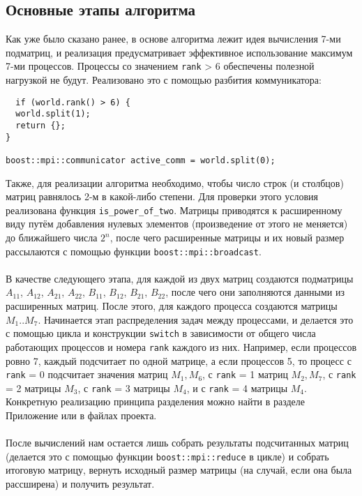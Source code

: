 \documentclass[a4paper,12pt]{article}
\begin{document}
\subsection{Основные этапы алгоритма}
Как уже было сказано ранее, в основе алгоритма лежит идея вычисления 7-ми подматриц, и реализация предусматривает эффективное использование максимум 7-ми процессов. Процессы со значением \texttt{rank} > 6 обеспечены полезной нагрузкой не будут. Реализовано это с помощью разбития коммуникатора:
\begin{lstlisting}
  if (world.rank() > 6) {
  world.split(1);
  return {};
}

boost::mpi::communicator active_comm = world.split(0);
\end{lstlisting}
Также, для реализации алгоритма необходимо, чтобы число строк (и столбцов) матриц равнялось 2-м в какой-либо степени. Для проверки этого условия реализована функция \texttt{is\_power\_of\_two}. Матрицы приводятся к расширенному виду путём добавления нулевых элементов (произведение от этого не меняется) до ближайшего числа $2^n$, после чего расширенные матрицы и их новый размер рассылаются с помощью функции \texttt{boost::mpi::broadcast}.\\ \\
В качестве следующего этапа, для каждой из двух матриц создаются подматрицы $A_{11}$, $A_{12}$, $A_{21}$, $A_{22}$, $B_{11}$, $B_{12}$, $B_{21}$, $B_{22}$, после чего они заполняются данными из расширенных матриц. После этого, для каждого процесса создаются матрицы $M_{1}..M_{7}$. Начинается этап распределения задач между процессами, и делается это с помощью цикла и конструкции \texttt{switch} в зависимости от общего числа работающих процессов и номера \texttt{rank} каждого из них. Например, если процессов ровно 7, каждый подсчитает по одной матрице, а если процессов 5, то процесс с \texttt{rank} = 0 подсчитает значения матриц $M_{1}, M_{6}$, с \texttt{rank} = 1 матриц $M_{2}, M_{7}$, с \texttt{rank} = 2 матрицы $M_{3}$, с \texttt{rank} = 3 матрицы $M_{4}$, и с \texttt{rank} = 4 матрицы $M_{4}$. Конкретную реализацию принципа разделения можно найти в разделе Приложение или в файлах проекта.\\ \\    
После вычислений нам остается лишь собрать результаты подсчитанных матриц (делается это с помощью функции \texttt{boost::mpi::reduce} в цикле) и собрать итоговую матрицу, вернуть исходный размер матрицы (на случай, если она была рассширена) и получить результат.
\end{document}
